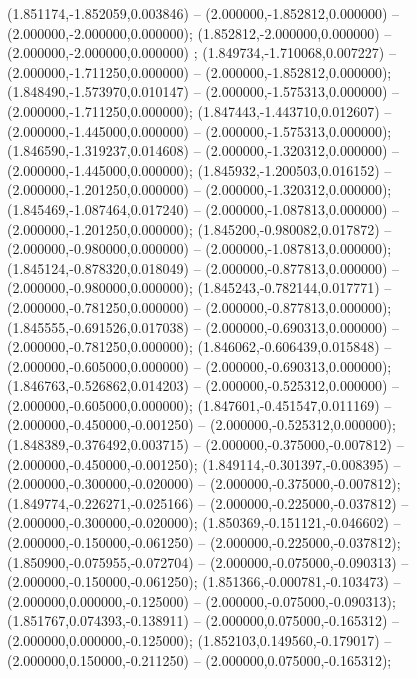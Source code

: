  (1.851174,-1.852059,0.003846) -- (2.000000,-1.852812,0.000000) -- (2.000000,-2.000000,0.000000);
 (1.852812,-2.000000,0.000000) -- (2.000000,-2.000000,0.000000) ;
 (1.849734,-1.710068,0.007227) -- (2.000000,-1.711250,0.000000) -- (2.000000,-1.852812,0.000000);
 (1.848490,-1.573970,0.010147) -- (2.000000,-1.575313,0.000000) -- (2.000000,-1.711250,0.000000);
 (1.847443,-1.443710,0.012607) -- (2.000000,-1.445000,0.000000) -- (2.000000,-1.575313,0.000000);
 (1.846590,-1.319237,0.014608) -- (2.000000,-1.320312,0.000000) -- (2.000000,-1.445000,0.000000);
 (1.845932,-1.200503,0.016152) -- (2.000000,-1.201250,0.000000) -- (2.000000,-1.320312,0.000000);
 (1.845469,-1.087464,0.017240) -- (2.000000,-1.087813,0.000000) -- (2.000000,-1.201250,0.000000);
 (1.845200,-0.980082,0.017872) -- (2.000000,-0.980000,0.000000) -- (2.000000,-1.087813,0.000000);
 (1.845124,-0.878320,0.018049) -- (2.000000,-0.877813,0.000000) -- (2.000000,-0.980000,0.000000);
 (1.845243,-0.782144,0.017771) -- (2.000000,-0.781250,0.000000) -- (2.000000,-0.877813,0.000000);
 (1.845555,-0.691526,0.017038) -- (2.000000,-0.690313,0.000000) -- (2.000000,-0.781250,0.000000);
 (1.846062,-0.606439,0.015848) -- (2.000000,-0.605000,0.000000) -- (2.000000,-0.690313,0.000000);
 (1.846763,-0.526862,0.014203) -- (2.000000,-0.525312,0.000000) -- (2.000000,-0.605000,0.000000);
 (1.847601,-0.451547,0.011169) -- (2.000000,-0.450000,-0.001250) -- (2.000000,-0.525312,0.000000);
 (1.848389,-0.376492,0.003715) -- (2.000000,-0.375000,-0.007812) -- (2.000000,-0.450000,-0.001250);
 (1.849114,-0.301397,-0.008395) -- (2.000000,-0.300000,-0.020000) -- (2.000000,-0.375000,-0.007812);
 (1.849774,-0.226271,-0.025166) -- (2.000000,-0.225000,-0.037812) -- (2.000000,-0.300000,-0.020000);
 (1.850369,-0.151121,-0.046602) -- (2.000000,-0.150000,-0.061250) -- (2.000000,-0.225000,-0.037812);
 (1.850900,-0.075955,-0.072704) -- (2.000000,-0.075000,-0.090313) -- (2.000000,-0.150000,-0.061250);
 (1.851366,-0.000781,-0.103473) -- (2.000000,0.000000,-0.125000) -- (2.000000,-0.075000,-0.090313);
 (1.851767,0.074393,-0.138911) -- (2.000000,0.075000,-0.165312) -- (2.000000,0.000000,-0.125000);
 (1.852103,0.149560,-0.179017) -- (2.000000,0.150000,-0.211250) -- (2.000000,0.075000,-0.165312);
